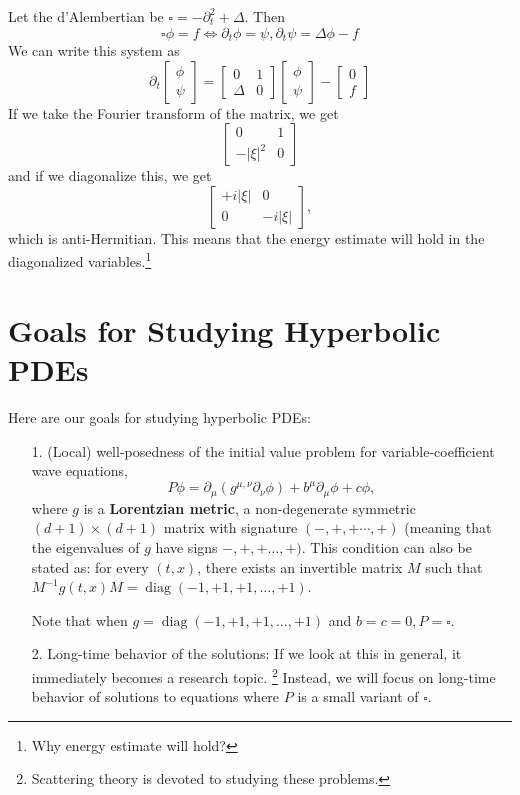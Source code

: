 \begin{example}
    [1st order formulation of $\square \phi=f$] Let the d'Alembertian be $\square=-\partial_{t}^{2}+\Delta$. Then
    $$
    \square \phi=f \Longleftrightarrow \partial_{t} \phi=\psi, \partial_{t} \psi=\Delta \phi-f
    $$
    We can write this system as
    $$
    \partial_{t}\left[\begin{array}{l}
    \phi \\
    \psi
    \end{array}\right]=\left[\begin{array}{ll}
    0 & 1 \\
    \Delta & 0
    \end{array}\right]\left[\begin{array}{l}
    \phi \\
    \psi
    \end{array}\right]-\left[\begin{array}{l}
    0 \\
    f
    \end{array}\right]
    $$
    If we take the Fourier transform of the matrix, we get
    $$
    \left[\begin{array}{cc}
    0 & 1 \\
    -|\xi|^{2} & 0
    \end{array}\right]
    $$
    and if we diagonalize this, we get
    $$
    \left[\begin{array}{cc}
    +i|\xi| & 0 \\
    0 & -i|\xi|
    \end{array}\right],
    $$
    which is anti-Hermitian. This means that the energy estimate will hold in the diagonalized variables.\footnote{Why energy estimate will hold?}

\end{example}
\section*{Goals for Studying Hyperbolic PDEs}
Here are our goals for studying hyperbolic PDEs:
\begin{itemize}
    \item [1.] (Local) well-posedness of the initial value problem for variable-coefficient wave equations,
    $$
    P \phi=\partial_{\mu}\left(g^{\mu, \nu} \partial_{\nu} \phi\right)+b^{\mu} \partial_{\mu} \phi+c \phi,
    $$
    where $g$ is a \textbf{Lorentzian metric}, a non-degenerate symmetric $(d+1) \times(d+1)$ matrix with signature $(-,+,+\cdots,+)$ (meaning that the eigenvalues of $g$ have signs $-,+,+\ldots,+)$. This condition can also be stated as: for every $(t, x)$, there exists an invertible matrix $M$ such that $M^{-1} g(t, x) M=\operatorname{diag}(-1,+1,+1, \ldots,+1)$.
    
    Note that when $g=\operatorname{diag}(-1,+1,+1, \ldots,+1)$ and $b=c=0, P=\square$.
    \item [2.] Long-time behavior of the solutions: If we look at this in general, it immediately becomes a research topic. \footnote{Scattering theory is devoted to studying these problems.} Instead, we will focus on long-time behavior of solutions to equations where $P$ is a small variant of $\square$.
\end{itemize}


